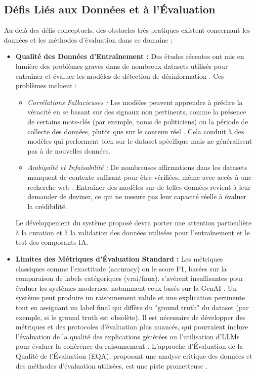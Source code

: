 \documentclass[9pt,twocolumn,french]{article}
\begin{document}
\subsection{Défis Liés aux Données et à l'Évaluation}

Au-delà des défis conceptuels, des obstacles très pratiques existent concernant les données et les méthodes d'évaluation dans ce domaine :

\begin{itemize}
    \item \textbf{Qualité des Données d'Entraînement :} Des études récentes ont mis en lumière des problèmes graves dans de nombreux datasets utilisés pour entraîner et évaluer les modèles de détection de désinformation \citep{Thibault2025A}. Ces problèmes incluent :
        \begin{itemize}
            \item \textit{Corrélations Fallacieuses :} Les modèles peuvent apprendre à prédire la véracité en se basant sur des signaux non pertinents, comme la présence de certains mots-clés (par exemple, noms de politiciens) ou la période de collecte des données, plutôt que sur le contenu réel \citep{Thibault2025A}. Cela conduit à des modèles qui performent bien sur le dataset spécifique mais ne généralisent pas à de nouvelles données.
            \item \textit{Ambiguïté et Infaisabilité :} De nombreuses affirmations dans les datasets manquent de contexte suffisant pour être vérifiées, même avec accès à une recherche web \citep{Thibault2025A}. Entraîner des modèles sur de telles données revient à leur demander de deviner, ce qui ne mesure pas leur capacité réelle à évaluer la crédibilité.
        \end{itemize}
    Le développement du système proposé devra porter une attention particulière à la curation et à la validation des données utilisées pour l'entraînement et le test des composants IA.

    \item \textbf{Limites des Métriques d'Évaluation Standard :} Les métriques classiques comme l'exactitude (accuracy) ou le score F1, basées sur la comparaison de labels catégoriques (vrai/faux), s'avèrent insuffisantes pour évaluer les systèmes modernes, notamment ceux basés sur la GenAI \citep{Thibault2025A}. Un système peut produire un raisonnement valide et une explication pertinente tout en assignant un label final qui diffère du "ground truth" du dataset (par exemple, si le ground truth est obsolète). Il est nécessaire de développer des métriques et des protocoles d'évaluation plus nuancés, qui pourraient inclure l'évaluation de la qualité des explications générées ou l'utilisation d'LLMs pour évaluer la cohérence du raisonnement \citep{Thibault2025A}. L'approche d'Évaluation de la Qualité de l'Évaluation (EQA), proposant une analyse critique des données et des méthodes d'évaluation utilisées, est une piste prometteuse \citep{Thibault2025A}.


\end{itemize}
\end{document}
